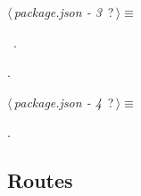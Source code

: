 \begin{flushleft} \small
\begin{minipage}{\linewidth}\label{scrap6}\raggedright\small
{} $\langle\,${\itshape {package.json - 3}}\nobreak\ {\footnotesize {?}}$\,\rangle\equiv$
\vspace{-1ex}
\begin{list}{}{} \item

                
        {\NWsep}
\end{list}
\vspace{-1.5ex}
\footnotesize
\begin{list}{}{\setlength{\itemsep}{-\parsep}\setlength{\itemindent}{-\leftmargin}}
\item \NWtxtMacroDefBy\ .
\item {\NWtxtMacroNoRef}.

\item{}
\end{list}
\end{minipage}\vspace{4ex}
\end{flushleft}
\begin{flushleft} \small
\begin{minipage}{\linewidth}\label{scrap7}\raggedright\small
{} $\langle\,${\itshape {package.json - 4}}\nobreak\ {\footnotesize {?}}$\,\rangle\equiv$
\vspace{-1ex}
\begin{list}{}{} \item

                
        {\NWsep}
\end{list}
\vspace{-1.5ex}
\footnotesize
\begin{list}{}{\setlength{\itemsep}{-\parsep}\setlength{\itemindent}{-\leftmargin}}
\item {\NWtxtMacroNoRef}.

\item{}
\end{list}
\end{minipage}\vspace{4ex}
\end{flushleft}
\subsection{Routes}

